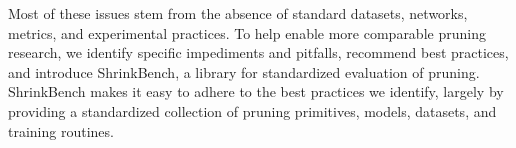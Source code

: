 


Most of these issues stem from the absence of standard datasets, networks, metrics, and experimental practices. %
To help enable more comparable pruning research,
we identify specific impediments and pitfalls, recommend best practices, and introduce ShrinkBench, a library for standardized evaluation of pruning. ShrinkBench makes it easy to adhere to the best practices we identify, largely by providing a standardized collection of pruning primitives, models, datasets, and training routines.

